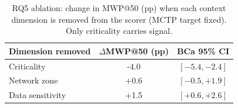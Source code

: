 \begin{table}[t]
\centering
\caption{RQ5 ablation: change in MWP@50 (pp) when each context dimension is removed from the scorer (MCTP target fixed). Only criticality carries signal.}
\label{tab:ablation}
\footnotesize
\begin{tabular}{@{}lcc@{}}
\toprule
Dimension removed & $\Delta$MWP@50 (pp) & BCa 95\% CI \\
\midrule
Criticality & -4.0 & $[-5.4,-2.4]$ \\
Network zone & +0.6 & $[-0.5,+1.9]$ \\
Data sensitivity & +1.5 & $[+0.6,+2.6]$ \\
\bottomrule
\end{tabular}
\end{table}
